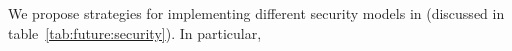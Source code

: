We propose strategies for implementing different security models in \liboses{}  (discussed in table~\ref{tab:future:security}).
In particular, 










%

